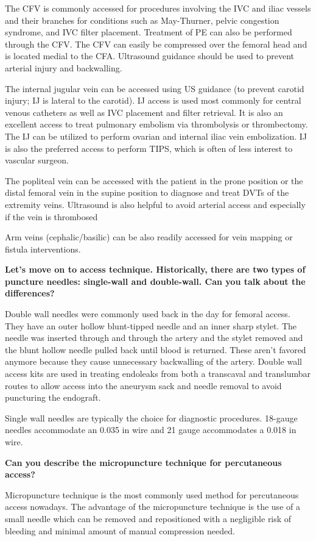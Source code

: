 \documentclass[
]{book}
\begin{document}
The CFV is commonly accessed for procedures involving the IVC and iliac
vessels and their branches for conditions such as May-Thurner, pelvic
congestion syndrome, and IVC filter placement. Treatment of PE can also
be performed through the CFV. The CFV can easily be compressed over the
femoral head and is located medial to the CFA. Ultrasound guidance
should be used to prevent arterial injury and backwalling.

The internal jugular vein can be accessed using US guidance (to prevent
carotid injury; IJ is lateral to the carotid). IJ access is used most
commonly for central venous catheters as well as IVC placement and
filter retrieval. It is also an excellent access to treat pulmonary
embolism via thrombolysis or thrombectomy. The IJ can be utilized to
perform ovarian and internal iliac vein embolization. IJ is also the
preferred access to perform TIPS, which is often of less interest to
vascular surgeon.

The popliteal vein can be accessed with the patient in the prone
position or the distal femoral vein in the supine position to diagnose
and treat DVTs of the extremity veins. Ultrasound is also helpful to
avoid arterial access and especially if the vein is thrombosed

Arm veins (cephalic/basilic) can be also readily accessed for vein
mapping or fistula interventions.

\textbf{Let's move on to access technique. Historically, there are two types
of puncture needles: single-wall and double-wall. Can you talk about the
differences?}

Double wall needles were commonly used back in the day for femoral
access. They have an outer hollow blunt-tipped needle and an inner sharp
stylet. The needle was inserted through and through the artery and the
stylet removed and the blunt hollow needle pulled back until blood is
returned. These aren't favored anymore because they cause unnecessary
backwalling of the artery. Double wall access kits are used in treating
endoleaks from both a transcaval and translumbar routes to allow access
into the aneurysm sack and needle removal to avoid puncturing the
endograft.

Single wall needles are typically the choice for diagnostic procedures.
18-gauge needles accommodate an 0.035 in wire and 21 gauge accommodates
a 0.018 in wire.

\textbf{Can you describe the micropuncture technique for percutaneous
access?}

Micropuncture technique is the most commonly used method for
percutaneous access nowadays. The advantage of the micropuncture
technique is the use of a small needle which can be removed and
repositioned with a negligible risk of bleeding and minimal amount of
manual compression needed.
\end{document}
